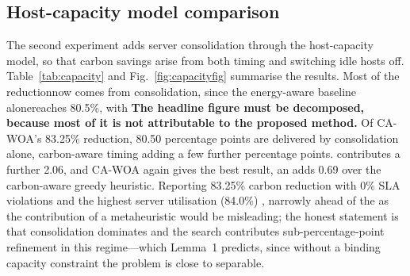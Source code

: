 \documentclass[12pt,a4paper]{article}
\providecommand{\DIFaddtex}[1]{{\protect\color{blue} \sf #1}} %
\providecommand{\DIFdeltex}[1]{{\protect\color{red} \scriptsize #1}} %
\providecommand{\DIFaddbegin}{} %
\providecommand{\DIFaddend}{} %
\providecommand{\DIFdelbegin}{} %
\providecommand{\DIFdelend}{} %
\providecommand{\DIFadd}[1]{\texorpdfstring{\DIFaddtex{#1}}{#1}} %
\providecommand{\DIFdel}[1]{\texorpdfstring{\DIFdeltex{#1}}{}} %
\providecommand{\DIFscaledelfig}{0.5}
\newlength{\DIFdelgraphicswidth} %
\newlength{\DIFdelgraphicsheight} %
\providecommand{\DIFaddincludegraphics}[2][]{{\color{blue}\fbox{\DIFOincludegraphics[#1]{#2}}}} %
\providecommand{\DIFdelincludegraphics}[2][]{%
\sbox{\DIFdelgraphicsbox}{\DIFOincludegraphics[#1]{#2}}%
\settoboxwidth{\DIFdelgraphicswidth}{\DIFdelgraphicsbox} %
\settoboxtotalheight{\DIFdelgraphicsheight}{\DIFdelgraphicsbox} %
\scalebox{\DIFscaledelfig}{%
\parbox[b]{\DIFdelgraphicswidth}{\usebox{\DIFdelgraphicsbox}\\[-\baselineskip] \rule{\DIFdelgraphicswidth}{0em}}\llap{\resizebox{\DIFdelgraphicswidth}{\DIFdelgraphicsheight}{%
\setlength{\unitlength}{\DIFdelgraphicswidth}%
\begin{picture}(1,1)%
\thicklines\linethickness{2pt} %
{\color[rgb]{1,0,0}\put(0,0){\framebox(1,1){}}}%
{\color[rgb]{1,0,0}\put(0,0){\line( 1,1){1}}}%
{\color[rgb]{1,0,0}\put(0,1){\line(1,-1){1}}}%
\end{picture}%
}\hspace*{3pt}}} %
} %
\DeclareRobustCommand{\DIFaddbegin}{\DIFOaddbegin \let\includegraphics\DIFaddincludegraphics} %
\DeclareRobustCommand{\DIFaddend}{\DIFOaddend \let\includegraphics\DIFOincludegraphics} %
\DeclareRobustCommand{\DIFdelbegin}{\DIFOdelbegin \let\includegraphics\DIFdelincludegraphics} %
\DeclareRobustCommand{\DIFdelend}{\DIFOaddend \let\includegraphics\DIFOincludegraphics} %
\begin{document}
\subsection{Host-capacity model comparison}
The second experiment adds server consolidation through the host-capacity model, so that carbon savings arise
from both timing and switching idle hosts off. Table~\ref{tab:capacity} and Fig.~\ref{fig:capacityfig}
summarise the results. \DIFdelbegin \DIFdel{Most of the reductionnow comes from consolidation, since the energy-aware baseline alonereaches 80.5\%,
with }\DIFdelend \DIFaddbegin \DIFadd{\textbf{The headline figure must be decomposed, because most of it is not attributable to the proposed
method.} Of CA-WOA's 83.25\% reduction, 80.50 percentage points are delivered by consolidation alone,
}\DIFaddend carbon-aware timing \DIFdelbegin \DIFdel{adding a few further percentage points. }\DIFdelend \DIFaddbegin \DIFadd{contributes a further 2.06, and }\DIFaddend CA-WOA \DIFdelbegin \DIFdel{again gives the best
result, an }\DIFdelend \DIFaddbegin \DIFadd{adds 0.69 over the carbon-aware greedy heuristic.
Reporting }\DIFaddend 83.25\% \DIFdelbegin \DIFdel{carbon reduction with 0\% SLA violations and the highest server utilisation (84.0\%) ,
narrowly ahead of the }\DIFdelend \DIFaddbegin \DIFadd{as the contribution of a metaheuristic would be misleading; the honest statement is that
consolidation dominates and the search contributes sub-percentage-point refinement in this regime---which
Lemma~1 predicts, since without a binding capacity constraint the problem is close to separable.
}
\end{document}

